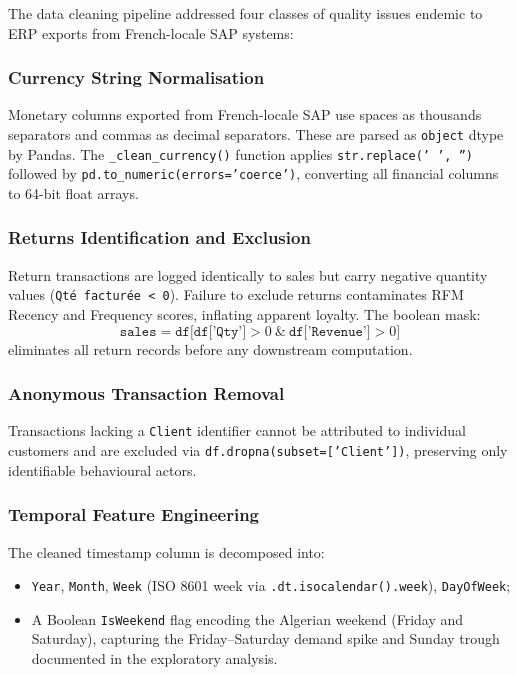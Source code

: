 The data cleaning pipeline addressed four classes of quality issues endemic to ERP exports from French-locale SAP systems:

\subsubsection{Currency String Normalisation}
Monetary columns exported from French-locale SAP use spaces as thousands separators and commas as decimal separators. These are parsed as \texttt{object} dtype by Pandas. The \texttt{\_clean\_currency()} function applies \texttt{str.replace(' ', '')} followed by \texttt{pd.to\_numeric(errors='coerce')}, converting all financial columns to 64-bit float arrays.

\subsubsection{Returns Identification and Exclusion}
Return transactions are logged identically to sales but carry negative quantity values (\texttt{Qté facturée < 0}). Failure to exclude returns contaminates RFM Recency and Frequency scores, inflating apparent loyalty. The boolean mask:
\begin{equation}
    \texttt{sales} = \texttt{df}\bigl[\texttt{df['Qty']} > 0\ \&\ \texttt{df['Revenue']} > 0\bigr]
    \label{eq:returns_mask}
\end{equation}
eliminates all return records before any downstream computation.

\subsubsection{Anonymous Transaction Removal}
Transactions lacking a \texttt{Client} identifier cannot be attributed to individual customers and are excluded via \texttt{df.dropna(subset=['Client'])}, preserving only identifiable behavioural actors.

\subsubsection{Temporal Feature Engineering}
The cleaned timestamp column is decomposed into:
\begin{itemize}[noitemsep]
    \item \texttt{Year}, \texttt{Month}, \texttt{Week} (ISO 8601 week via \texttt{.dt.isocalendar().week}), \texttt{DayOfWeek};
    \item A Boolean \texttt{IsWeekend} flag encoding the Algerian weekend (Friday and Saturday), capturing the Friday--Saturday demand spike and Sunday trough documented in the exploratory analysis.
\end{itemize}

